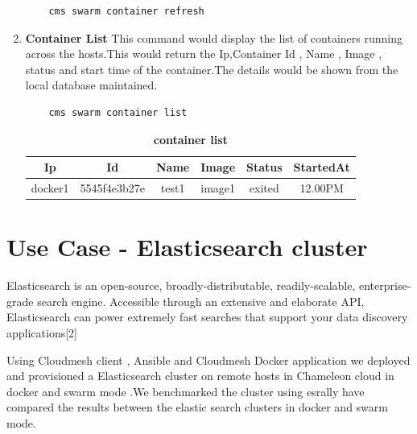 \documentclass[9pt,twocolumn,twoside]{../../styles/osajnl}
\begin{document}
\begin{enumerate}
    \begin{verbatim}
    cms swarm container refresh
    \end{verbatim} 

    \item \textbf{Container List}
    This command would display the list of containers running across the hosts.This would return the Ip,Container Id , Name , Image , status and start time of the container.The details would be shown from the local database maintained.
    
    \begin{verbatim}
    cms swarm container list
    \end{verbatim} 
    
     \begin{table}[htbp]
     \caption{\bf container list }
     \begin{tabular}{cccccc}
     \hline
      Ip & Id & Name & Image &Status&StartedAt\\
      \hline
      docker1 & 5545f4e3b27e & test1 & image1 &exited & 12.00PM \\
     \hline
     \end{tabular}
     \label{tab:tab10}
     \end{table}
\end{enumerate}

\section{Use Case - Elasticsearch cluster }
 Elasticsearch\cite{www-ElasticSearch} is an open-source, broadly-distributable, readily-scalable, enterprise-grade search engine. Accessible through an extensive and elaborate API, Elasticsearch can power extremely fast searches that support your data discovery applications[2]

 Using Cloudmesh  client , Ansible and Cloudmesh Docker application we deployed  and provisioned a Elasticsearch cluster on remote  hosts in Chameleon cloud in docker and swarm mode .We benchmarked the cluster using esrally\cite{www-ElasticSearchRally}  have compared  the  results between the elastic search clusters in docker and swarm mode.
 
 
\end{document}
